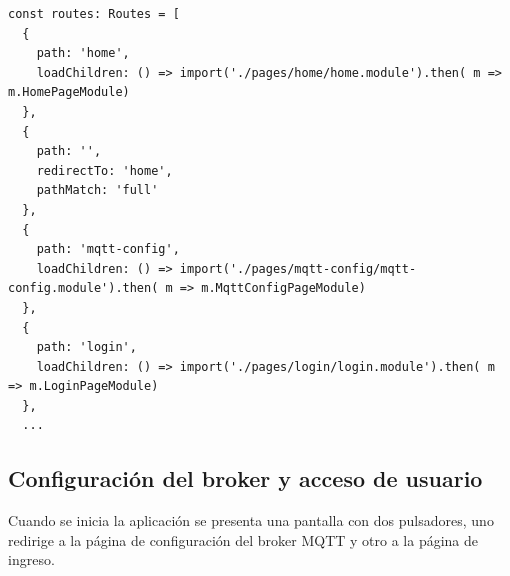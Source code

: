 \begin{lstlisting}[label=cod:Rutas aplicación Móvil.,caption=  Fragmento de las rutas de la aplicación móvil.]
const routes: Routes = [
  {
    path: 'home',
    loadChildren: () => import('./pages/home/home.module').then( m => m.HomePageModule)
  },
  {
    path: '',
    redirectTo: 'home',
    pathMatch: 'full'
  },
  {
    path: 'mqtt-config',
    loadChildren: () => import('./pages/mqtt-config/mqtt-config.module').then( m => m.MqttConfigPageModule)
  },
  {
    path: 'login',
    loadChildren: () => import('./pages/login/login.module').then( m => m.LoginPageModule)
  },
  ...

\end{lstlisting} 

\pagebreak

\subsection{Configuración del broker y acceso de usuario}

Cuando se inicia la aplicación se presenta una pantalla con dos pulsadores, uno redirige a la página de configuración del broker MQTT y otro a la página de ingreso.



